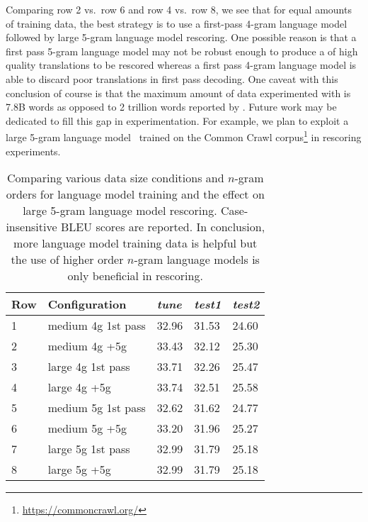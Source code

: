 Comparing row 2 vs.\ row 6 and row 4 vs.\ row 8, we see
that for equal amounts of training data, the best strategy
is to use a first-pass 4-gram language model followed by
large 5-gram language model rescoring. One possible reason
is that a first pass 5-gram language model may not be robust enough
to produce a of high quality translations to be rescored whereas
a first pass 4-gram language model is able to discard poor translations in first pass
decoding.
One caveat with this
conclusion of course is that the maximum amount of data experimented
with is 7.8B words as opposed to 2 trillion words reported
by \citet{brants-popat-xu-och-dean:2007:EMNLP-CoNLL}. Future work may be dedicated to fill this gap in experimentation.
For example, we plan to exploit a large 5-gram language model~\citep{buck-heafield-vanooyen:2014:LREC}
trained on the Common Crawl corpus\footnote{\url{https://commoncrawl.org/}}
in rescoring experiments.
%
\begin{table}
  \begin{center}
    \begin{tabular}{l|l|lll}
      Row & Configuration & \emph{tune} & \emph{test1} & \emph{test2} \\
      \hline
      1 & medium 4g 1st pass & 32.96 & 31.53 & 24.60 \\
      2 & medium 4g +5g &       33.43 & 32.12 & 25.30 \\
      \hline
      3 & large 4g 1st pass  & 33.71 & 32.26 & 25.47 \\
      4 & large 4g +5g       & 33.74 & 32.51 & 25.58 \\
      \hline
      5 & medium 5g 1st pass & 32.62 & 31.62 & 24.77 \\
      6 & medium 5g +5g       & 33.20 & 31.96 & 25.27 \\
      \hline
      7 & large 5g 1st pass  & 32.99 & 31.79 & 25.18 \\
      8 & large 5g +5g       & 32.99 & 31.79 & 25.18 \\
    \end{tabular}
    \caption{Comparing various data size conditions and $n$-gram orders
      for language model training and the effect on large 5-gram language
      model rescoring. Case-insensitive BLEU scores are reported.
      In conclusion, more language
      model training data is helpful but the use of higher order $n$-gram language
      models is only beneficial in rescoring.}
    \label{tab:lmSizes}
  \end{center}
\end{table}

